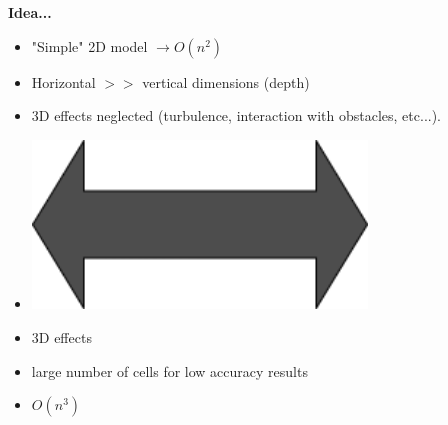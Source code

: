 \begin{frame}
{\Large \textbf{Idea...}}\\[1.5cm]
\hspace{1cm}
\begin{minipage}{0.35\textwidth}
\begin{tcolorbox}[
colframe=TUMDarkBlue,
colback=white,
title = \centering Shallow Water Equations\\2D] 
\begin{itemize}
\setlength\itemsep{1em}
\item<2->[+] "Simple" 2D model $\rightarrow O(n^2)$
\item<2->[-] Horizontal $>>$ vertical dimensions (depth) 
\item<2->[-] 3D effects neglected {\small(turbulence, interaction with obstacles, etc...)}. \vspace{0.5cm}
\end{itemize}
\end{tcolorbox}    
\end{minipage}
\begin{minipage}{0.15\textwidth}
\hspace{0.5cm}
\begin{itemize}
\item<4->[]\includegraphics[width=0.7\textwidth]{Resources/Images/arrow4.png}\\
\end{itemize}
\end{minipage}
\begin{minipage}{0.35\textwidth}
\begin{tcolorbox} [
colframe=TUMOrange,
colback=white,
title = \centering Navier-Stokes\\3D]     
\begin{itemize}
\setlength\itemsep{1.3em}
\item<3->[+] 3D effects 
\item<3->[-] large number of cells for low accuracy results
\item<3->[-] $O(n^3)$\vspace{0.7cm}
\end{itemize}
\end{tcolorbox}    
\end{minipage}
\end{frame}



